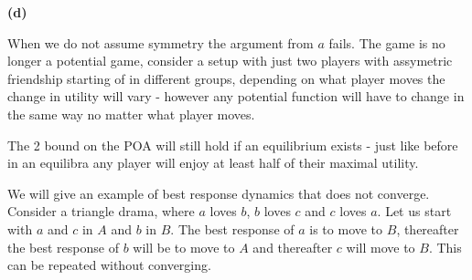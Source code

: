 \textbf{(d)}

When we do not assume symmetry the argument from $a$ fails. The game is no longer a potential game, consider a setup with just two players with assymetric friendship starting of in different groups, depending on what player moves the change in utility will vary - however any potential function will have to change in the same way no matter what player moves. 

The 2 bound on the POA will still hold if an equilibrium exists - just like before in an equilibra any player will enjoy at least half of their maximal utility.

We will give an example of best response dynamics that does not converge. Consider a triangle drama, where $a$ loves $b$, $b$ loves $c$ and $c$ loves $a$. Let us start with $a$ and $c$ in $A$ and $b$ in $B$. The best response of $a$ is to move to $B$, thereafter the best response of $b$ will be to move to $A$ and thereafter $c$ will move to $B$. This can be repeated without converging. 


